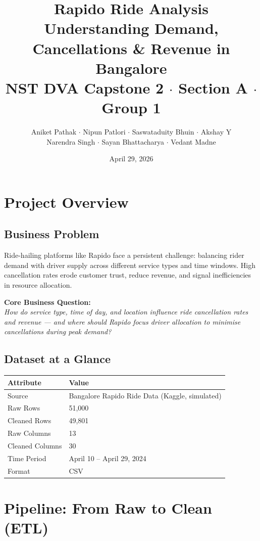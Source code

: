 \documentclass[12pt,a4paper]{article}
\title{\textbf{\Huge Rapido Ride Analysis}\\[0.5em]
\large Understanding Demand, Cancellations \& Revenue in Bangalore\\[0.3em]
\normalsize NST DVA Capstone 2 $\cdot$ Section A $\cdot$ Group 1}
\author{Aniket Pathak $\cdot$ Nipun Patlori $\cdot$ Saswataduity Bhuin $\cdot$ Akshay Y\\
Narendra Singh $\cdot$ Sayan Bhattacharya $\cdot$ Vedant Madne}
\date{April 29, 2026}
\begin{document}
\maketitle
\tableofcontents
\newpage

\section{Project Overview}

\subsection{Business Problem}
Ride-hailing platforms like Rapido face a persistent challenge: balancing rider demand with driver supply across different service types and time windows. High cancellation rates erode customer trust, reduce revenue, and signal inefficiencies in resource allocation.

\textbf{Core Business Question:}\\
\textit{How do service type, time of day, and location influence ride cancellation rates and revenue --- and where should Rapido focus driver allocation to minimise cancellations during peak demand?}

\subsection{Dataset at a Glance}
\begin{center}
\begin{tabular}{ll}
\toprule
\textbf{Attribute} & \textbf{Value} \\
\midrule
Source & Bangalore Rapido Ride Data (Kaggle, simulated) \\
Raw Rows & 51,000 \\
Cleaned Rows & 49,801 \\
Raw Columns & 13 \\
Cleaned Columns & 30 \\
Time Period & April 10 -- April 29, 2024 \\
Format & CSV \\
\bottomrule
\end{tabular}
\end{center}

\section{Pipeline: From Raw to Clean (ETL)}
\end{document}
